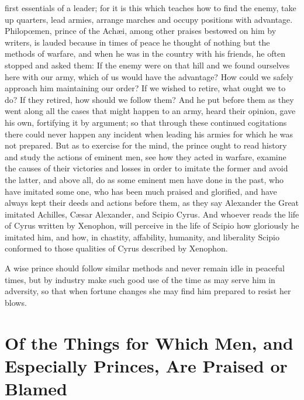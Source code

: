 \documentclass[12pt,letterpaper]{memoir}
\begin{document}
first essentials of a leader; for it is this which teaches how to find
the enemy, take up quarters, lead armies, arrange marches and occupy
positions with advantage. Philopœmen, prince of the Achæi, among other
praises bestowed on him by writers, is lauded because in times of peace
he thought of nothing but the methods of warfare, and when he was in
the country with his friends, he often stopped and asked them: If the
enemy were on that hill and we found ourselves here with our army,
which of us would have the advantage? How could we safely approach
him maintaining our order? If we wished to retire, what ought we to
do? If they retired, how should we follow them? And he put before them
as they went along all the cases that might happen to an army, heard
their opinion, gave his own, fortifying it by argument; so that through
these continued cogitations there could never happen any incident when
leading his armies for which he was not prepared. But as to exercise
for the mind, the prince ought to read history and study the actions
of eminent men, see how they acted in warfare, examine the causes of
their victories and losses in order to imitate the former and avoid the
latter, and above all, do as some eminent men have done in the past,
who have imitated some one, who has been much praised and glorified,
and have always kept their deeds and actions before them, as they say
Alexander the Great imitated Achilles, Cæsar Alexander, and Scipio
Cyrus. And whoever reads the life of Cyrus written by Xenophon, will
perceive in the life of Scipio how gloriously he imitated him, and how,
in chastity, affability, humanity, and liberality Scipio conformed to
those qualities of Cyrus described by Xenophon.

A wise prince should follow similar methods and never remain idle in
peaceful times, but by industry make such good use of the time as may
serve him in adversity, so that when fortune changes she may find him
prepared to resist her blows.

\chapter{Of the Things for Which Men, and Especially Princes, Are Praised or Blamed}
\end{document}
